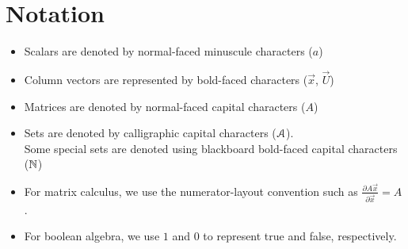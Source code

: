 \documentclass[../main.tex]{subfiles}
\begin{document}
\chapter*{Notation}
\adjustmtc
\begin{itemize}
  \item Scalars are denoted by normal-faced minuscule characters ($a$)
  \item Column vectors are represented by bold-faced characters ($\vec{x}$, $\vec{U}$)
  \item Matrices are denoted by normal-faced capital characters ($A$)
  \item Sets are denoted by calligraphic capital characters ($\mathcal{A}$).
        \\Some special sets are denoted using blackboard bold-faced capital characters ($\mathbb{N}$)
  \item For matrix calculus, we use the numerator-layout convention such as $\frac{\partial A\vec{x}}{\partial\vec{x}}=A$.
  \item For boolean algebra, we use $1$ and $0$ to represent true and false, respectively.
\end{itemize}

\end{document}
